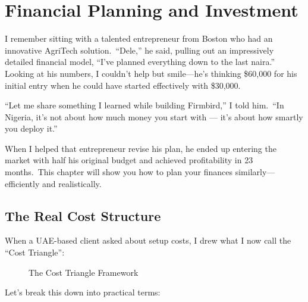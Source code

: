 \chapter{Financial Planning and Investment}\label{ch:financial-planning}

I remember sitting with a talented entrepreneur from Boston who had an innovative AgriTech solution.\ ``Dele,'' he said, pulling out an impressively detailed financial model, ``I've planned everything down to the last naira.'' Looking at his numbers, I couldn't help but smile—he's thinking \$60,000 for his initial entry when he could have started effectively with \$30,000.

``Let me share something I learned while building Firmbird,'' I told him.\ ``In Nigeria, it's not about how much money you start with --- it's about how smartly you deploy it.''

\begin{importantbox}
When I helped that entrepreneur revise his plan, he ended up entering the market with half his original budget and achieved profitability in 23 months.\ This chapter will show you how to plan your finances similarly—efficiently and realistically.
\end{importantbox}


\section{The Real Cost Structure}\label{sec:real-cost-structure}

When a UAE-based client asked about setup costs, I drew what I now call the ``Cost Triangle'':

\begin{figure}[h]
    \centering
    \caption{The Cost Triangle Framework}
    \label{fig:cost-triangle}
\end{figure}

Let's break this down into practical terms:

